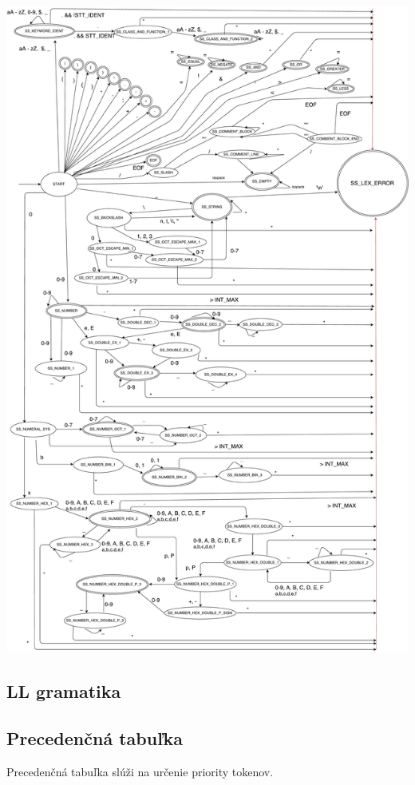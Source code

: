 \documentclass[12pt, a4paper]{article}
\begin{document}
            \begin{center}
            \includegraphics[width=\paperwidth,height=\textheight,keepaspectratio]{ka_scanner_diagram.pdf}
            \end{center}

        \subsection{LL gramatika}

        \subsection{Precedenčná tabuľka} \label{sec:tab}
        Precedenčná tabuľka slúži na určenie priority tokenov.
\end{document}
